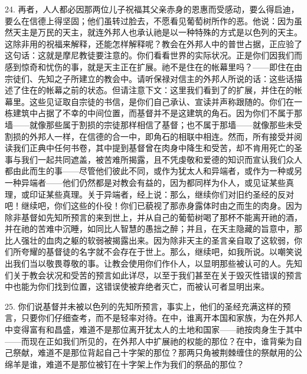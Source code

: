 24. 再者，人人都必因那两位儿子祝福其父亲赤身的恩惠而受感动，要么得启迪，要么在信德上得坚固；他们虽转过脸去，不愿看见葡萄树所作的恶。他说：因为虽然天主是万民的天主，就连外邦人也承认祂是以一种特殊的方式是以色列的天主。这除非用的祝福来解释，还能怎样解释呢？教会在外邦人中的普世占据，正应验了这句话：这就是摩尼教徒要注意的。你们看看世界的实际状况。正是你们因我们而感到惊奇和忧伤的事，就是天主正在扩展。祂不是住在的帐幕里吗？——即住在由宗徒们、先知之子所建立的教会中。请听保禄对信主的外邦人所说的话：这些话描述了住在的帐幕之前的状态。但请注意下文：这里我们看到了的扩展，并住在的帐幕里。这些见证取自宗徒的书信，是你们自己承认、宣读并声称跟随的。你们在一栋建筑中占据了不幸的中间位置，而基督并不是这建筑的角石。因为你们不属于那墙——就像那些属于割损的宗徒那样相信了基督；也不属于那墙——就像那些未受割损的外邦人一样，在信德的合一中，即角石的相联中相连。然而，所有接受并阅读我们正典中任何书卷，其中提到基督曾在肉身中降生和受苦，却不肯用死亡的圣事与我们一起共同遮盖，被苦难所揭露，且不凭虔敬和爱德的知识而宣认我们众人都由此而生的事——尽管他们彼此不同，或作为犹太人和异端者，或作为一种或另一种异端者——他们仍然都是对教会有益的，因为都同样为仆人，或见证某些真理，或印证某些真理。关于异端者，经上说：那么，继续你们对旧约圣经的反对吧！继续吧，你们这些的仆役！你们已藐视了那赤身露体时由之而生的肉身。因为除非基督如先知所预言的来到世上，并从自己的葡萄树喝了那杯不能离开祂的酒，并在祂的苦难中沉睡，如同比人智慧的愚拙之醉；并且，在天主隐藏的旨意中，那比人强壮的血肉之躯的软弱被揭露出来。因为除非天主的圣言亲自取了这软弱，你们所夸耀的基督徒的名字就不会存在于世上。那么，继续吧，如我所说。以嘲笑说出我们当以敬畏尊敬的事。让教会使用你们作仆人，以显明那些被认可的人。先知们关于教会状况和受苦的预言如此详尽，以至于我们甚至在关于毁灭性错误的预言中也能为你们找到位置，这错误使被弃绝者灭亡，而被认可者显明出来。\par

25. 你们说基督并未被以色列的先知所预言，事实上，他们的圣经充满这样的预言，只要你们仔细查考，而不是轻率对待。在中，谁离开本国和家族，为在外邦人中变得富有和昌盛，难道不是那位离开犹太人的土地和国家——祂按肉身生于其中——而现在正如我们所见的，在外邦人中扩展祂的权能的那位？在中，谁背柴为自己祭献，难道不是那位背起自己十字架的那位？那两只角被荆棘缠住的祭献用的公绵羊是谁，难道不是那位被钉在十字架上作为我们的祭品的那位？\par

